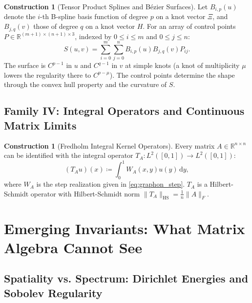 \documentclass[11pt,a4paper,reqno]{amsart}
\theoremstyle{definition}
\newtheorem{construction}[theorem]{Construction}
\numberwithin{equation}{section}
\providecommand{\R}{\mathbb{R}}
\newcommand{\dif}{\,\mathrm{d}}
\begin{document}
\begin{construction}[Tensor Product Splines and B\'ezier Surfaces]
Let $B_{i, p}(u)$ denote the $i$-th B-spline basis function of degree $p$ on a knot vector $\Xi$, and $B_{j,q}(v)$ those of degree $q$ on a knot vector $H$. For an array of control points $P \in \R^{(m+1) \times (n+1) \times 3}$, indexed by $0 \le i \le m$ and $0 \le j \le n$:
\begin{equation}
    S(u, v) = \sum_{i=0}^m \sum_{j=0}^n B_{i, p}(u) B_{j, q}(v) P_{ij}.
\end{equation}
The surface is $C^{p-1}$ in $u$ and $C^{q-1}$ in $v$ at simple knots (a knot of multiplicity $\mu$ lowers the regularity there to $C^{p-\mu}$). The control points determine the shape through the convex hull property and the curvature of $S$.
\end{construction}

\subsection{Family IV: Integral Operators and Continuous Matrix Limits}
\label{subsec:fam4}

\begin{construction}[Fredholm Integral Kernel Operators]
Every matrix $A \in \R^{n \times n}$ can be identified with the integral operator $T_A \colon L^2([0, 1]) \to L^2([0, 1])$:
\begin{equation}
    (T_A u)(x) \coloneqq \int_0^1 W_A(x, y) u(y) \dif y,
\end{equation}
where $W_A$ is the step realization given in \eqref{eq:graphon_step}. $T_A$ is a Hilbert-Schmidt operator with Hilbert-Schmidt norm $\|T_A\|_{\mathrm{HS}} = \frac{1}{n} \|A\|_F$.
\end{construction}

\section{Emerging Invariants: What Matrix Algebra Cannot See}
\label{sec:emerging_invariants}

\subsection{Spatiality vs. Spectrum: Dirichlet Energies and Sobolev Regularity}
\label{subsec:sobolev}
\end{document}
